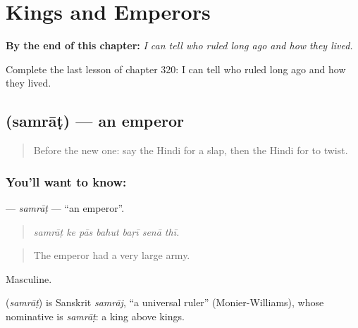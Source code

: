 
\chapter{Kings and Emperors}
\label{ch:hi-kings-and-emperors}

\begin{chapteropening}
\textbf{By the end of this chapter:} \emph{I can tell who ruled long ago and how they lived.}

Complete the last lesson of chapter 320: I can tell who ruled long ago and how they lived.
\end{chapteropening}

\section[\texorpdfstring{\hi{सम्राट} (samrāṭ)}{सम्राट (samrāṭ)}]{ (samrāṭ) — an emperor}

\label{lesson:HI-C320-samrat}



\begin{quote}
Before the new one: say the Hindi for a slap, then the Hindi for to twist.
\end{quote}

\subsection*{You'll want to know: }
\textbf{} — \emph{samrāṭ} — \textquotedblleft{}an emperor\textquotedblright{}.

\begin{quote}
      
\end{quote}

\begin{quote}
\emph{samrāṭ ke pās bahut baṛī senā thī.}
\end{quote}

\begin{quote}
The emperor had a very large army.
\end{quote}

Masculine.

\begin{cousinweb}
\textbf{} (\emph{samrāṭ}) is Sanskrit \emph{samrāj}, \textquotedblleft{}a universal ruler\textquotedblright{} (Monier-Williams), whose nominative is \emph{samrāṭ}: a king above kings.
\end{cousinweb}

